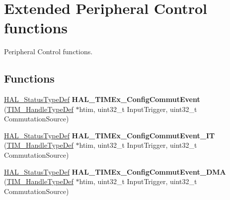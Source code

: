 \hypertarget{group___t_i_m_ex___exported___functions___group5}{}\section{Extended Peripheral Control functions}
\label{group___t_i_m_ex___exported___functions___group5}


Peripheral Control functions.  


\subsection*{Functions}
\begin{DoxyCompactItemize}
\item 
\mbox{\label{group___t_i_m_ex___exported___functions___group5_gab5802aa4b8b5a79b93b209b0277622ac}} 
\hyperlink{stm32f4xx__hal__def_8h_a63c0679d1cb8b8c684fbb0632743478f}{H\+A\+L\+\_\+\+Status\+Type\+Def} {\bfseries H\+A\+L\+\_\+\+T\+I\+M\+Ex\+\_\+\+Config\+Commut\+Event} (\hyperlink{struct_t_i_m___handle_type_def}{T\+I\+M\+\_\+\+Handle\+Type\+Def} $\ast$htim, uint32\+\_\+t Input\+Trigger, uint32\+\_\+t Commutation\+Source)
\item 
\mbox{\label{group___t_i_m_ex___exported___functions___group5_gad9f5f717a203adafb70e66451b4f0472}} 
\hyperlink{stm32f4xx__hal__def_8h_a63c0679d1cb8b8c684fbb0632743478f}{H\+A\+L\+\_\+\+Status\+Type\+Def} {\bfseries H\+A\+L\+\_\+\+T\+I\+M\+Ex\+\_\+\+Config\+Commut\+Event\+\_\+\+IT} (\hyperlink{struct_t_i_m___handle_type_def}{T\+I\+M\+\_\+\+Handle\+Type\+Def} $\ast$htim, uint32\+\_\+t Input\+Trigger, uint32\+\_\+t Commutation\+Source)
\item 
\mbox{\label{group___t_i_m_ex___exported___functions___group5_ga6ab2af489cfc5783e4ddd76a35edde31}} 
\hyperlink{stm32f4xx__hal__def_8h_a63c0679d1cb8b8c684fbb0632743478f}{H\+A\+L\+\_\+\+Status\+Type\+Def} {\bfseries H\+A\+L\+\_\+\+T\+I\+M\+Ex\+\_\+\+Config\+Commut\+Event\+\_\+\+D\+MA} (\hyperlink{struct_t_i_m___handle_type_def}{T\+I\+M\+\_\+\+Handle\+Type\+Def} $\ast$htim, uint32\+\_\+t Input\+Trigger, uint32\+\_\+t Commutation\+Source)
\item 
\mbox{\label{group___t_i_m_ex___exported___functions___group5_ga056fd97d3be6c60dcfa12963f6ec8aad}} 

\end{DoxyCompactItemize}
